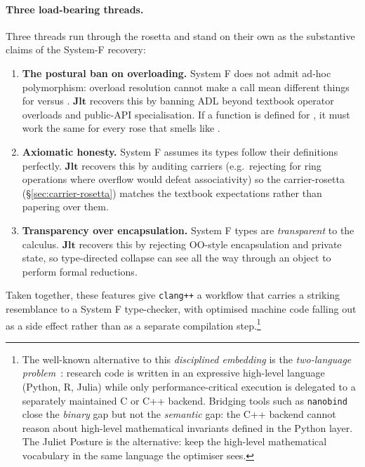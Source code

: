\documentclass[11pt, a4paper]{article}
\begin{document}
\paragraph{Three load-bearing threads.}
Three threads run through the rosetta and stand on their own as the substantive claims of the System-F recovery:

\begin{enumerate}
\item \textbf{The postural ban on overloading.}  System F does not admit ad-hoc polymorphism: overload resolution cannot make a call mean different things for  versus .
$\mathbf{Jlt}$ recovers this by banning ADL beyond textbook operator overloads and public-API specialisation.
If a function is defined for , it must work the same for every rose that smells like .
\item \textbf{Axiomatic honesty.}  System F assumes its types follow their definitions perfectly.
$\mathbf{Jlt}$ recovers this by auditing carriers (e.g.\ rejecting  for ring operations where overflow would defeat associativity) so the carrier-rosetta (§\ref{sec:carrier-rosetta}) matches the textbook expectations rather than papering over them.
\item \textbf{Transparency over encapsulation.}  System F types are \emph{transparent} to the calculus.
$\mathbf{Jlt}$ recovers this by rejecting OO-style encapsulation and private state, so type-directed collapse can see all the way through an object to perform formal reductions.
\end{enumerate}

Taken together, these features give \texttt{clang++} a workflow that carries a striking resemblance to a System F type-checker, with optimised machine code falling out as a side effect rather than as a separate compilation step.\footnote{The well-known alternative to this \emph{disciplined embedding} is the \emph{two-language problem}~\cite{bezanson2017julia}: research code is written in an expressive high-level language (Python, R, Julia) while only performance-critical execution is delegated to a separately maintained C or C++ backend.  Bridging tools such as \texttt{nanobind}~\cite{jakob2022nanobind} close the \emph{binary} gap but not the \emph{semantic} gap: the C++ backend cannot reason about high-level mathematical invariants defined in the Python layer.  The Juliet Posture is the alternative: keep the high-level mathematical vocabulary in the same language the optimiser sees.}
\end{document}
